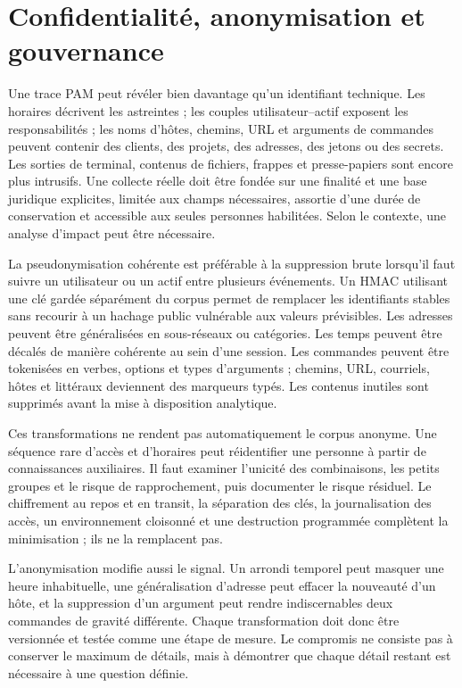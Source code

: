 \documentclass[11pt,a4paper,oneside]{report}
\theoremstyle{definition}
\theoremstyle{plain}
\begin{document}
\section{Confidentialité, anonymisation et gouvernance}

Une trace PAM peut révéler bien davantage qu'un identifiant technique. Les
horaires décrivent les astreintes ; les couples utilisateur--actif exposent les
responsabilités ; les noms d'hôtes, chemins, URL et arguments de commandes
peuvent contenir des clients, des projets, des adresses, des jetons ou des
secrets. Les sorties de terminal, contenus de fichiers, frappes et
presse-papiers sont encore plus intrusifs. Une collecte réelle doit être fondée
sur une finalité et une base juridique explicites, limitée aux champs
nécessaires, assortie d'une durée de conservation et accessible aux seules
personnes habilitées. Selon le contexte, une analyse d'impact peut être
nécessaire.

La pseudonymisation cohérente est préférable à la suppression brute lorsqu'il
faut suivre un utilisateur ou un actif entre plusieurs événements. Un HMAC
utilisant une clé gardée séparément du corpus permet de remplacer les
identifiants stables sans recourir à un hachage public vulnérable aux valeurs
prévisibles. Les adresses peuvent être généralisées en sous-réseaux ou
catégories. Les temps peuvent être décalés de manière cohérente au sein d'une
session. Les commandes peuvent être tokenisées en verbes, options et types
d'arguments ; chemins, URL, courriels, hôtes et littéraux deviennent des
marqueurs typés. Les contenus inutiles sont supprimés avant la mise à
disposition analytique.

Ces transformations ne rendent pas automatiquement le corpus anonyme. Une
séquence rare d'accès et d'horaires peut réidentifier une personne à partir de
connaissances auxiliaires. Il faut examiner l'unicité des combinaisons, les
petits groupes et le risque de rapprochement, puis documenter le risque
résiduel. Le chiffrement au repos et en transit, la séparation des clés, la
journalisation des accès, un environnement cloisonné et une destruction
programmée complètent la minimisation ; ils ne la remplacent pas.

L'anonymisation modifie aussi le signal. Un arrondi temporel peut masquer une
heure inhabituelle, une généralisation d'adresse peut effacer la nouveauté d'un
hôte, et la suppression d'un argument peut rendre indiscernables deux commandes
de gravité différente. Chaque transformation doit donc être versionnée et
testée comme une étape de mesure. Le compromis ne consiste pas à conserver le
maximum de détails, mais à démontrer que chaque détail restant est nécessaire
à une question définie.
\end{document}

